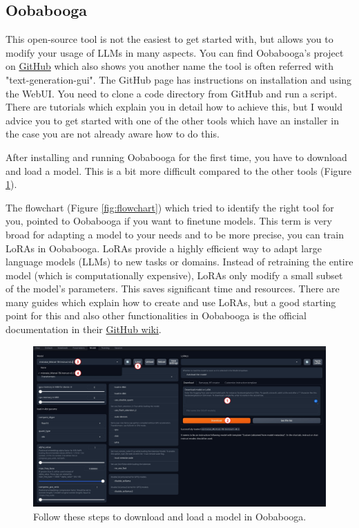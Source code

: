 \documentclass[parskip=half]{scrreprt} %
\begin{document}
\subsection{Oobabooga}
This open-source tool is not the easiest to get started with, but allows you to modify your usage of LLMs in many aspects.
You can find Oobabooga's project on \href{https://github.com/oobabooga/text-generation-webui}{GitHub} which also shows you another name the tool is often referred with "text-generation-gui".
The GitHub page has instructions on installation and using the WebUI.
You need to clone a code directory from GitHub and run a script.
There are tutorials which explain you in detail how to achieve this, but I would advice you to get started with one of the other tools which have an installer in the case you are not already aware how to do this.

After installing and running Oobabooga for the first time, you have to download and load a model. This is a bit more difficult compared to the other tools (Figure \ref{fig:ooba}). 

The flowchart (Figure \ref{fig:flowchart}) which tried to identify the right tool for you, pointed to Oobabooga if you want to finetune models.
This term is very broad for adapting a model to your needs and to be more precise, you can train LoRAs in Oobabooga.
LoRAs provide a highly efficient way to adapt large language models (LLMs) to new tasks or domains.
Instead of retraining the entire model (which is computationally expensive), LoRAs only modify a small subset of the model's parameters.
This saves significant time and resources.
There are many guides which explain how to create and use LoRAs, but a good starting point for this and also other functionalities in Oobabooga is the official documentation in their \href{https://github.com/oobabooga/text-generation-webui/wiki}{GitHub wiki}.

\begin{figure}[h]
	\includegraphics[width=\textwidth]{ooba-model}
	\caption{Follow these steps to download and load a model in Oobabooga.}
	\centering
	\label{fig:ooba}
\end{figure}
\end{document}
